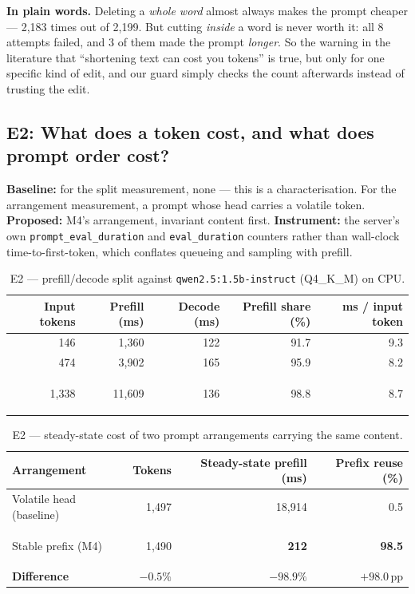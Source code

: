 \documentclass[11pt,a4paper]{article}
\newcommand{\hl}[1]{\colorbox{hlyellow}{\strut #1}}
\newcommand{\plain}[1]{%
  \par\vspace{1pt}
  \noindent\begin{tcolorbox}[colback=plainblue,colframe=plainrule,boxrule=0pt,
    leftrule=2.2pt,arc=0pt,left=7pt,right=5pt,top=4pt,bottom=4pt,breakable]
  \small\textbf{In plain words.} #1
  \end{tcolorbox}\par\vspace{2pt}}
\begin{document}
\plain{Deleting a \emph{whole word} almost always makes the prompt cheaper ---
2{,}183 times out of 2{,}199. But cutting \emph{inside} a word is never worth it:
all 8 attempts failed, and 3 of them made the prompt \emph{longer}. So the
warning in the literature that ``shortening text can cost you tokens'' is true,
but only for one specific kind of edit, and our guard simply checks the count
afterwards instead of trusting the edit.}

\subsection{E2: What does a token cost, and what does prompt order cost?}
\label{sec:e2}

\textbf{Baseline:} for the split measurement, none --- this is a characterisation.
For the arrangement measurement, a prompt whose head carries a volatile token.
\textbf{Proposed:} M4's arrangement, invariant content first.
\textbf{Instrument:} the server's own \texttt{prompt\_eval\_duration} and
\texttt{eval\_duration} counters rather than wall-clock time-to-first-token,
which conflates queueing and sampling with prefill.

\begin{table}[htbp]
\centering
\caption{E2 --- prefill/decode split against \texttt{qwen2.5:1.5b-instruct}
(Q4\_K\_M) on CPU.}
\label{tab:prefill}
\footnotesize
\begin{tabular}{@{}r rr r r@{}}
\toprule
\textbf{Input tokens} & \textbf{Prefill (ms)} & \textbf{Decode (ms)} &
\textbf{Prefill share (\%)} & \textbf{ms / input token} \\
\midrule
146    & 1{,}360  & 122 & 91.7 & 9.3 \\
474    & 3{,}902  & 165 & 95.9 & 8.2 \\
1{,}338 & 11{,}609 & 136 & \hl{98.8} & 8.7 \\
\bottomrule
\end{tabular}
\end{table}

\begin{table}[htbp]
\centering
\caption{E2 --- steady-state cost of two prompt arrangements carrying the same
content.}
\label{tab:prefix}
\footnotesize
\begin{tabular}{@{}l r r r@{}}
\toprule
\textbf{Arrangement} & \textbf{Tokens} & \textbf{Steady-state prefill (ms)} &
\textbf{Prefix reuse (\%)} \\
\midrule
Volatile head (baseline)   & 1{,}497 & 18{,}914 & 0.5 \\
Stable prefix (M4)         & 1{,}490 & \hl{\textbf{212}} & \textbf{98.5} \\
\midrule
\textbf{Difference}        & $-0.5\%$ & $\mathbf{-98.9\%}$ & $+98.0$\,pp \\
\bottomrule
\end{tabular}
\end{table}
\end{document}
